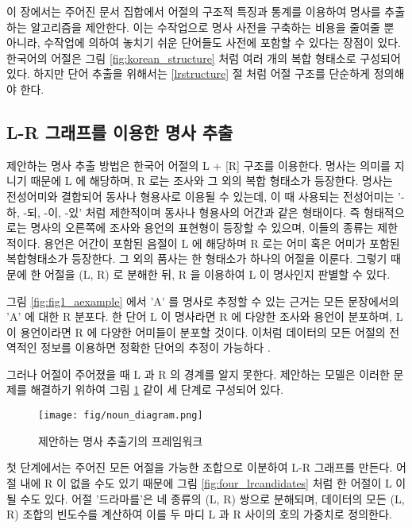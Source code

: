 \documentclass[oneside, ko,phd]{snuthesis_utf8_kor}
\begin{document}
이 장에서는 주어진 문서 집합에서 어절의 구조적 특징과 통계를 이용하여 명사를 추출하는 알고리즘을 제안한다.
이는 수작업으로 명사 사전을 구축하는 비용을 줄여줄 뿐 아니라, 수작업에 의하여 놓치기 쉬운 단어들도 사전에 포함할 수 있다는 장점이 있다.
한국어의 어절은 그림 \ref{fig:korean_structure} 처럼 여러 개의 복합 형태소로 구성되어 있다.
하지만 단어 추출을 위해서는 \ref{lrstructure} 절 처럼 어절 구조를 단순하게 정의해야 한다.

\subsection{L-R 그래프를 이용한 명사 추출}

제안하는 명사 추출 방법은 한국어 어절의 L + [R] 구조를 이용한다.
명사는 의미를 지니기 때문에 L 에 해당하며, R 로는 조사와 그 외의 복합 형태소가 등장한다.
명사는 전성어미와 결합되어 동사나 형용사로 이용될 수 있는데, 이 때 사용되는 전성어미는 '-하, -되, -이, -있' 처럼 제한적이며 동사나 형용사의 어간과 같은 형태이다.
즉 형태적으로는 명사의 오른쪽에 조사와 용언의 표현형이 등장할 수 있으며, 이들의 종류는 제한적이다.
용언은 어간이 포함된 음절이 L 에 해당하며 R 로는 어미 혹은 어미가 포함된 복합형태소가 등장한다.
그 외의 품사는 한 형태소가 하나의 어절을 이룬다.
그렇기 때문에 한 어절을 (L, R) 로 분해한 뒤, R 을 이용하여 L 이 명사인지 판별할 수 있다.

그림 \ref{fig:fig1_aexample} 에서 'A' 를 명사로 추정할 수 있는 근거는 모든 문장에서의 'A' 에 대한 R 분포다.
한 단어 L 이 명사라면 R 에 다양한 조사와 용언이 분포하며, L 이 용언이라면 R 에 다양한 어미들이 분포할 것이다.
이처럼 데이터의 모든 어절의 전역적인 정보를 이용하면 정확한 단어의 추정이 가능하다 \cite{zhao2007incorporating}.

그러나 어절이 주어졌을 때 L 과 R 의 경계를 알지 못한다.
제안하는 모델은 이러한 문제를 해결하기 위하여 그림 \ref{fig:noun_diagram} 같이 세 단계로 구성되어 있다.

\begin{figure}[ht]
\centering
\texttt{[image: fig/noun\_diagram.png]}
\caption{제안하는 명사 추출기의 프레임워크}
\label{fig:noun_diagram}
\end{figure}

첫 단계에서는 주어진 모든 어절을 가능한 조합으로 이분하여 L-R 그래프를 만든다.
어절 내에 R 이 없을 수도 있기 때문에 그림 \ref{fig:four_lrcandidates} 처럼 한 어절이 L 이 될 수도 있다.
어절 '드라마를'은 네 종류의 (L, R) 쌍으로 분해되며, 데이터의 모든 (L, R) 조합의 빈도수를 계산하여 이를 두 마디 L 과 R 사이의 호의 가중치로 정의한다.
\end{document}
